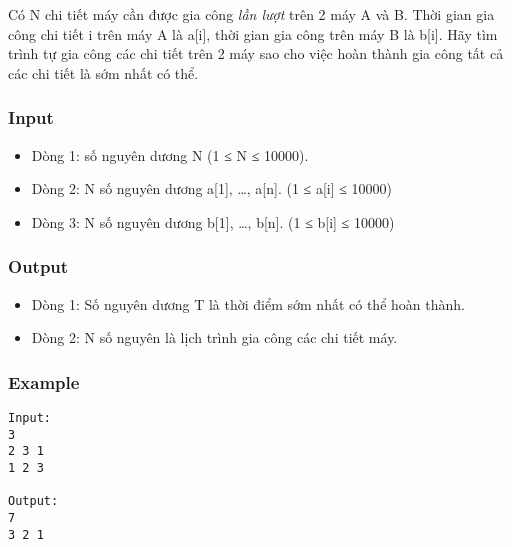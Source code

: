 



   Có N chi tiết máy cần được gia công   \textit{    lần lượt   }   trên 2 máy A và B. Thời gian gia công chi tiết i trên máy A là a[i], thời gian gia công trên máy B là b[i]. Hãy tìm trình tự gia công các chi tiết trên 2 máy sao cho việc hoàn thành gia công tất cả các chi tiết là sớm nhất có thể.  

\subsubsection{   Input  }
\begin{itemize}
	\item     Dòng 1: số nguyên dương N (1 ≤ N ≤ 10000).   
	\item     Dòng 2: N số nguyên dương a[1], …, a[n]. (1 ≤ a[i] ≤ 10000)   
	\item     Dòng 3: N số nguyên dương b[1], …, b[n]. (1 ≤ b[i] ≤ 10000)   
\end{itemize}

\subsubsection{   Output  }
\begin{itemize}
	\item     Dòng 1: Số nguyên dương T là thời điểm sớm nhất có thể hoàn thành.   
	\item     Dòng 2: N số nguyên là lịch trình gia công các chi tiết máy.   
\end{itemize}

\subsubsection{   Example  }
\begin{verbatim}
Input:
3
2 3 1
1 2 3

Output:
7
3 2 1
\end{verbatim}